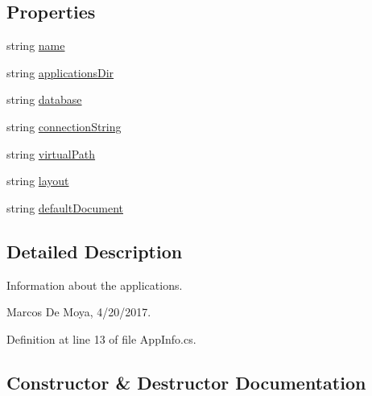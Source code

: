\subsection*{Properties}
\begin{DoxyCompactItemize}
\item 
string \hyperlink{class_p_http_1_1_app_info_a2d2a1695a1ebcee1c6d045f291c127c8}{name}
\item 
string \hyperlink{class_p_http_1_1_app_info_abc0623c7d5a48d5d0e68930da311a74f}{applications\+Dir}
\item 
string \hyperlink{class_p_http_1_1_app_info_a51ede3fc74bb3364787a2016c976a3bc}{database}
\item 
string \hyperlink{class_p_http_1_1_app_info_ac319cff1fe0fbd1de94f3bd376122646}{connection\+String}
\item 
string \hyperlink{class_p_http_1_1_app_info_a4432977962617879b03ff44ea66e55fa}{virtual\+Path}
\item 
string \hyperlink{class_p_http_1_1_app_info_a9f665f7d26a23c651e32eeb9b0a9b655}{layout}
\item 
string \hyperlink{class_p_http_1_1_app_info_ac898312eef3e4a7430adce0fb35e7114}{default\+Document}
\end{DoxyCompactItemize}


\subsection{Detailed Description}
Information about the applications. 

Marcos De Moya, 4/20/2017. 

Definition at line 13 of file App\+Info.\+cs.



\subsection{Constructor \& Destructor Documentation}
\mbox{\label{class_p_http_1_1_app_info_a8ac157ce05450f6cc1d2a72eb26db830}} 

